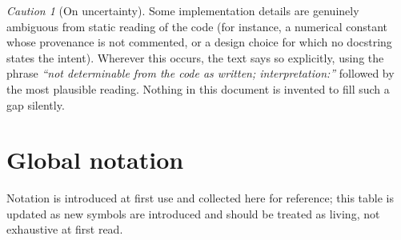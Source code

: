 \documentclass[11pt,a4paper]{report}
\theoremstyle{definition}
\theoremstyle{remark}
\newtheorem{caution}[caution]{Caution}
\begin{document}
\begin{caution}[On uncertainty]
Some implementation details are genuinely ambiguous from static reading of
the code (for instance, a numerical constant whose provenance is not
commented, or a design choice for which no docstring states the intent).
Wherever this occurs, the text says so explicitly, using the phrase
\emph{``not determinable from the code as written; interpretation:''}
followed by the most plausible reading. Nothing in this document is
invented to fill such a gap silently.
\end{caution}

\section*{Global notation}

Notation is introduced at first use and collected here for reference; this
table is updated as new symbols are introduced and should be treated as
living, not exhaustive at first read.
\end{document}

